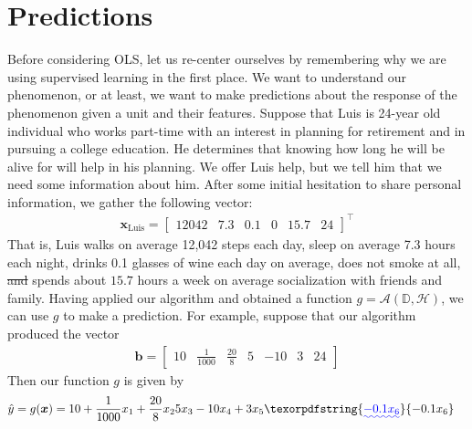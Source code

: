 \documentclass[12pt]{article}
\providecommand{\DIFaddtex}[1]{{\protect\color{blue}\uwave{#1}}} %
\providecommand{\DIFdeltex}[1]{{\protect\color{red}\sout{#1}}}                      %
\providecommand{\DIFaddbegin}{} %
\providecommand{\DIFaddend}{} %
\providecommand{\DIFdelbegin}{} %
\providecommand{\DIFdelend}{} %
\providecommand{\DIFadd}[1]{\texorpdfstring{\DIFaddtex{#1}}{#1}} %
\providecommand{\DIFdel}[1]{\texorpdfstring{\DIFdeltex{#1}}{}} %
\begin{document}
	\section{Predictions}
	Before considering OLS, let us re-center ourselves by remembering why
	we are using supervised learning in the first place. We want to understand
	our phenomenon, or at least, we want to make predictions about the response
	of the phenomenon given a unit and their features. Suppose that Luis
	is 24-year old individual who works part-time with an interest in planning
	for retirement and in pursuing a college education. He determines that knowing how
	long he will be alive for will help in his planning. We offer Luis help, but we tell
	him that we need some information about him. After some initial hesitation to share
	personal information, we gather the following vector:
	\begin{align*}
		\bm{x}_{\text{Luis}} = \DIFdelbegin %
\DIFdelend \DIFaddbegin \begin{bmatrix}
			12042 & 7.3 & 0.1 & 0 & 15.7 & 24
		\end{bmatrix}\DIFaddend ^\top
	\end{align*}
	That is, Luis walks on average 12,042 steps each day, sleep on average 7.3 hours
	each night, drinks 0.1 glasses of wine each day on average, does not smoke at all,
	\DIFdelbegin \DIFdel{and
	}\DIFdelend spends about $15.7$ hours a week on average socialization with friends and family\DIFaddbegin \DIFadd{,
	and has lived for 24 years}\DIFaddend .
	Having applied our algorithm and obtained a function $g=\mathcal{A}(\mathbb{D}, \mathcal{H})$,
	we can use $g$ to make a prediction. For example, suppose that our algorithm
	produced the vector
	\begin{align*}
		\bm{b} = \DIFdelbegin %
\DIFdelend \DIFaddbegin \begin{bmatrix}
			10 & \frac{1}{1000} & \frac{20}{8} & 5 & -10 & 3 & 24
		\end{bmatrix}\DIFaddend 
	\end{align*}
	Then our function $g$ is given by
	\begin{align*}
		\hat{y} = g(\bm{x}) = 10 + \frac{1}{1000}x_1 + \frac{20}{8}x_2 & 5x_3 - 10x_4 + 3x_5
		\DIFaddbegin \DIFadd{-0.1x_6
	}\DIFaddend \end{align*}
\end{document}
